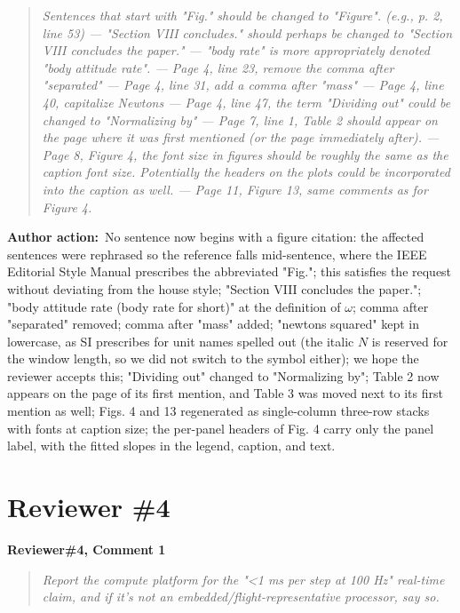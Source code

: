 \documentclass[11pt]{article}
\newcommand{\concern}[1]{\par\medskip\noindent\colorbox{gray!12}{\parbox{\dimexpr\linewidth-2\fboxsep}{\textbf{#1}}}\par\smallskip}
\newcommand{\rlabel}[1]{\par\textbf{#1}\ }
\begin{document}
\begin{quote}\itshape Sentences that start with "Fig." should be changed to "Figure". (e.g., p. 2, line 53) --- "Section VIII concludes." should perhaps be changed to "Section VIII concludes the paper." --- "body rate" is more appropriately denoted "body attitude rate". --- Page 4, line 23, remove the comma after "separated" --- Page 4, line 31, add a comma after "mass" --- Page 4, line 40, capitalize Newtons --- Page 4, line 47, the term "Dividing out" could be changed to "Normalizing by" --- Page 7, line 1, Table 2 should appear on the page where it was first mentioned (or the page immediately after). --- Page 8, Figure 4, the font size in figures should be roughly the same as the caption font size. Potentially the headers on the plots could be incorporated into the caption as well. --- Page 11, Figure 13, same comments as for Figure 4.\end{quote}

\rlabel{Author action:}No sentence now begins with a figure citation: the affected sentences were rephrased so the reference falls mid-sentence, where the IEEE Editorial Style Manual prescribes the abbreviated "Fig."; this satisfies the request without deviating from the house style; "Section VIII concludes the paper."; "body attitude rate (body rate for short)" at the definition of $\omega$; comma after "separated" removed; comma after "mass" added; "newtons squared" kept in lowercase, as SI prescribes for unit names spelled out (the italic $N$ is reserved for the window length, so we did not switch to the symbol either); we hope the reviewer accepts this; "Dividing out" changed to "Normalizing by"; Table 2 now appears on the page of its first mention, and Table 3 was moved next to its first mention as well; Figs. 4 and 13 regenerated as single-column three-row stacks with fonts at caption size; the per-panel headers of Fig. 4 carry only the panel label, with the fitted slopes in the legend, caption, and text.

\section*{Reviewer \#4}

\concern{Reviewer\#4, Comment 1}

\begin{quote}\itshape Report the compute platform for the "<1 ms per step at 100 Hz" real-time claim, and if it's not an embedded/flight-representative processor, say so.\end{quote}
\end{document}
